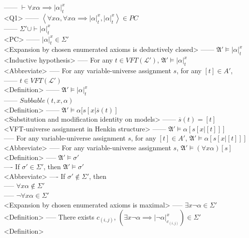 \documentclass{book}
\newcommand{\inot}{\not}
\newcommand{\extend}[1]{\overline{#1}}
\newcommand{\seq}[1]{\left\langle #1 \right\rangle}
\newcommand{\sub}[3]{\left|#1\right|_{#3}^{#2}}
\begin{document}
						------ $\vdash \forall x \alpha \implies \sub{\alpha}{x}{t}$ \\ <Q1>
						------ $\seq{\forall x \alpha, \forall x \alpha \implies \sub{\alpha}{x}{t}, \sub{\alpha}{x}{t}} \in PC$ \\
						------ $\Sigma' \cup \vdash \sub{\alpha}{x}{t}$ \\ <PC>
						------ $\sub{\alpha}{x}{t} \in \Sigma'$ \\ <Expansion by chosen enumerated axioms is deductively closed>
						------ $\mathfrak{A}' \vDash \sub{\alpha}{x}{t}$ \\ <Inductive hypothesis>
					----- For any $t \in VFT(\mathcal{L}')$, $\mathfrak{A}' \vDash \sub{\alpha}{x}{t}$ \\ <Abbreviate>
					-----	For any variable-universe assignment $s$, for any $[t] \in A'$, \\
						------ $t \in VFT(\mathcal{L}')$ \\ <Definition>
						------ $\mathfrak{A}' \vDash \sub{\alpha}{x}{t}$ \\
						------ $Subbable(t, x, \alpha)$ \\ <Definition>
						------ $\mathfrak{A}' \vDash \alpha[s[x|\extend{s}(t)]$ \\ <Substitution and modification identity on models>
						------ $\extend{s}(t) = [t]$ \\ <VFT-universe assignment in Henkin structure>
						------ $\mathfrak{A}' \vDash \alpha[s[x|[t]]]$ \\
					----- For any variable-universe assignment $s$, for any $[t] \in A'$, $\mathfrak{A}' \vDash \alpha[s[x|[t]]]$ \\ <Abbreviate>
					----- For any variable-universe assignment $s$, $\mathfrak{A}' \vDash (\forall x \alpha)[s]$ \\ <Definition>
					----- $\mathfrak{A}' \vDash \sigma'$ \\
				---- If $\sigma' \in \Sigma'$, then $\mathfrak{A}' \vDash \sigma'$ \\ <Abbreviate>
				---- If $\sigma' \inot \in \Sigma'$, then \\ 
					----- $\forall x \alpha \inot \in \Sigma'$ \\
					----- $\lnot \forall x \alpha \in \Sigma'$ \\ <Expansion by chosen enumerated axioms is maximal>
					----- $\exists x \lnot \alpha \in \Sigma'$ \\ <Definition>
					----- There exists $c_{(i, j)}$, $(\exists x \lnot \alpha \implies \sub{\lnot \alpha}{x}{c_{(i, j)}}) \in \Sigma'$ \\ <Definition>
\end{document}
